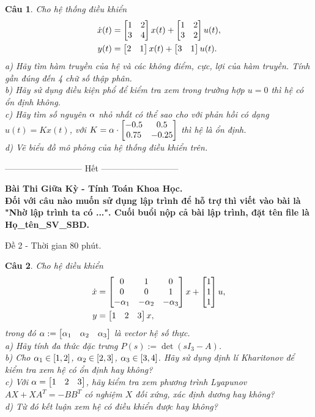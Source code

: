 \documentclass[11pt]{article}
\newtheorem{bt}{Câu}
\begin{document}
\begin{bt}\label{Câu 1b}
	Cho hệ thống điều khiển
	\begin{align}
		\dot{x}(t) &= \begin{bmatrix} 1 & 2 \\ 3 & 4 \end{bmatrix} x(t) + \begin{bmatrix} 1 & 2 \\ 3 & 2 \end{bmatrix} u(t), \\
		y(t) &= \begin{bmatrix} 2 & 1 \end{bmatrix} x(t) + \begin{bmatrix} 3 & 1 \end{bmatrix} u(t). 
	\end{align}
	a) Hãy tìm hàm truyền của hệ và các không điểm, cực, lợi của hàm truyền. Tính gần đúng đến 4 chữ số thập phân. \\
	b) Hãy sử dụng điều kiện phổ để kiểm tra xem trong trường hợp $u=0$ thì hệ có ổn định không. \\
	c) Hãy tìm số nguyên $\alpha$ nhỏ nhất có thể sao cho với phản hồi có dạng $u(t) = K x(t)$, với $K = \alpha \cdot \begin{bmatrix}  -0.5 & 0.5 \\ 0.75 & -0.25 \end{bmatrix}$ thì hệ là ổn định. \\ 
	d) Vẽ biểu đồ mô phỏng của hệ thống điều khiển trên.
\end{bt}

\begin{center}
	--------------------------- Hết ---------------------------
\end{center}

\pagebreak 



\begin{center}
	{\bf Bài Thi Giữa Kỳ - Tính Toán Khoa Học. \\
		Đối với câu nào muốn sử dụng lập trình để hỗ trợ thì viết vào bài là "Nhờ lập trình ta có ...". Cuối buổi nộp cả bài lập trình, đặt tên file là Họ\_tên\_SV\_SBD.}
\end{center}

\begin{center}
	Đề 2 - Thời gian 80 phút.
\end{center}

\begin{bt}
Cho hệ điều khiển
%
\begin{align}\label{eq3}
	\dot{x} &= \begin{bmatrix} 0 & 1 & 0 \\ 0 & 0 & 1 \\ -\alpha_1 & -\alpha_2 & -\alpha_{3}  \end{bmatrix} x + \begin{bmatrix} 1 \\ 1 \\ 1 \end{bmatrix} u, \\
	y &= \begin{bmatrix} 1 & 2 & 3 \end{bmatrix} x, 
\end{align}
%
trong đó $\alpha := \begin{bmatrix} \alpha_1 & \alpha_2 & \alpha_3  \end{bmatrix}$ là vector hệ số thực. \\
a) Hãy tính đa thức đặc trưng $P(s) := \det(sI_3-A)$. \\
b) Cho $\alpha_1 \in [1,2]$, $\alpha_2 \in [2,3]$, $\alpha_3 \in [3,4]$. Hãy sử dụng định lí Kharitonov để kiểm tra xem hệ có ổn định hay không? \\
c) Với $\alpha = \begin{bmatrix} 1 & 2 & 3 \end{bmatrix}$, hãy kiểm tra xem phương trình Lyapunov $A X + X A^T = -B B^T$ có nghiệm $X$ đối xứng, xác định dương hay không? \\  
d) Từ đó kết luận xem hệ có điều khiển được hay không?
\end{bt}   
\end{document}
